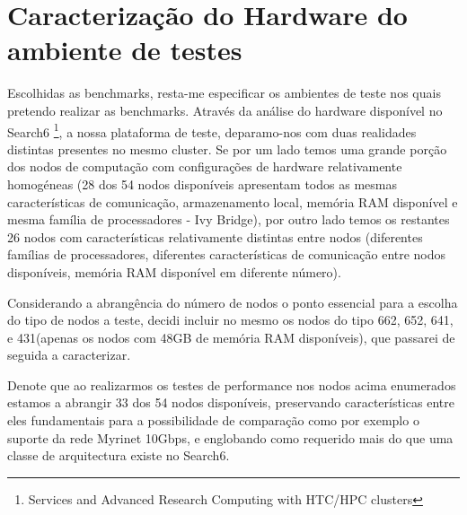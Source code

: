 \documentclass[conference,compsoc]{IEEEtran}
\begin{document}
\section{Caracterização do Hardware do ambiente de testes}
Escolhidas as benchmarks, resta-me especificar os ambientes de teste nos quais pretendo realizar as benchmarks. Através da análise do hardware disponível no Search6 \footnote{Services and Advanced Research Computing with HTC/HPC clusters}, a nossa plataforma de teste, deparamo-nos com duas 
realidades distintas presentes no mesmo cluster. Se por um lado temos uma grande porção dos nodos de computação com configurações de hardware relativamente homogéneas (28 dos 54 nodos disponíveis apresentam todos as mesmas características de comunicação, armazenamento local, memória RAM disponível e mesma família de processadores - Ivy Bridge), por outro lado temos os restantes 26 nodos com características relativamente distintas entre nodos (diferentes famílias de processadores, diferentes características de comunicação entre nodos disponíveis, memória RAM disponível em diferente número). \par 
Considerando a abrangência do número de nodos o ponto essencial para a escolha do tipo de nodos a teste, decidi incluir no mesmo os nodos do tipo 662, 652, 641, e 431(apenas os nodos com 48GB de memória RAM disponíveis), que passarei de seguida a caracterizar. \par 
Denote que ao realizarmos os testes de performance nos nodos acima enumerados estamos a abrangir 33 dos 54 nodos disponíveis, preservando características entre eles fundamentais para a possibilidade de comparação como por exemplo o suporte da rede Myrinet 10Gbps, e englobando como requerido mais do que uma classe de arquitectura existe no Search6.\par 
\end{document}
